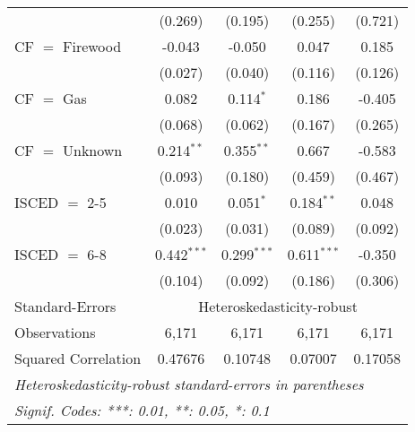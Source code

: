 \begin{table}[htbp!]
\begin{adjustbox}{width = 1\textwidth, max height = 0.95\textheight, center}
\begin{threeparttable}[b]
\begin{tabular}{lcccc}
                                 & (0.269)            & (0.195)            & (0.255)        & (0.721)\\   
            CF $=$ Firewood      & -0.043             & -0.050             & 0.047          & 0.185\\   
                                 & (0.027)            & (0.040)            & (0.116)        & (0.126)\\   
            CF $=$ Gas           & 0.082              & 0.114$^{*}$        & 0.186          & -0.405\\   
                                 & (0.068)            & (0.062)            & (0.167)        & (0.265)\\   
            CF $=$ Unknown       & 0.214$^{**}$       & 0.355$^{**}$       & 0.667          & -0.583\\   
                                 & (0.093)            & (0.180)            & (0.459)        & (0.467)\\   
            ISCED $=$ 2-5        & 0.010              & 0.051$^{*}$        & 0.184$^{**}$   & 0.048\\   
                                 & (0.023)            & (0.031)            & (0.089)        & (0.092)\\   
            ISCED $=$ 6-8        & 0.442$^{***}$      & 0.299$^{***}$      & 0.611$^{***}$  & -0.350\\   
                                 & (0.104)            & (0.092)            & (0.186)        & (0.306)\\   
            \midrule 
            Standard-Errors & \multicolumn{4}{c}{Heteroskedasticity-robust} \\ 
            Observations         & 6,171              & 6,171              & 6,171          & 6,171\\  
            Squared Correlation  & 0.47676            & 0.10748            & 0.07007        & 0.17058\\  
            \midrule \midrule
            \multicolumn{5}{l}{\emph{Heteroskedasticity-robust standard-errors in parentheses}}\\
            \multicolumn{5}{l}{\emph{Signif. Codes: ***: 0.01, **: 0.05, *: 0.1}}\\
         \end{tabular}
         

\end{threeparttable}
\end{adjustbox}
\end{table}
